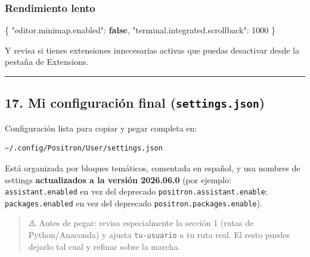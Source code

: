 \documentclass[
  doc,
  floatsintext,
  longtable,
  a4paper,
  nolmodern,
  notxfonts,
  notimes,
  12pt,
  colorlinks=true,linkcolor=blue,citecolor=blue,urlcolor=blue]{apa7}
\newenvironment{Shaded}{\begin{snugshade}}{\end{snugshade}}
\newcommand{\DataTypeTok}[1]{\textcolor[rgb]{0.68,0.00,0.00}{#1}}
\newcommand{\DecValTok}[1]{\textcolor[rgb]{0.68,0.00,0.00}{#1}}
\newcommand{\FunctionTok}[1]{\textcolor[rgb]{0.28,0.35,0.67}{#1}}
\newcommand{\KeywordTok}[1]{\textcolor[rgb]{0.00,0.23,0.31}{\textbf{#1}}}
\begin{document}
\subsubsection{Rendimiento lento}\label{rendimiento-lento}

\begin{Shaded}
\begin{Highlighting}[]
\FunctionTok{\{}
  \DataTypeTok{"editor.minimap.enabled"}\FunctionTok{:} \KeywordTok{false}\FunctionTok{,}
  \DataTypeTok{"terminal.integrated.scrollback"}\FunctionTok{:} \DecValTok{1000}
\FunctionTok{\}}
\end{Highlighting}
\end{Shaded}

Y revisa si tienes extensiones innecesarias activas que puedas
desactivar desde la pestaña de Extensions.

\begin{center}\rule{0.5\linewidth}{0.5pt}\end{center}

\subsection{\texorpdfstring{17. Mi configuración final
(\texttt{settings.json})}{17. Mi configuración final (settings.json)}}\label{mi-configuraciuxf3n-final-settings.json}

Configuración lista para copiar y pegar completa en:

\begin{verbatim}
~/.config/Positron/User/settings.json
\end{verbatim}

Está organizada por bloques temáticos, comentada en español, y usa
nombres de settings \textbf{actualizados a la versión 2026.06.0} (por
ejemplo: \texttt{assistant.enabled} en vez del deprecado
\texttt{positron.assistant.enable}; \texttt{packages.enabled} en vez del
deprecado \texttt{positron.packages.enable}).

\begin{quote}
⚠️ Antes de pegar: revisa especialmente la sección 1 (rutas de
Python/Anaconda) y ajusta \texttt{tu-usuario} a tu ruta real. El resto
puedes dejarlo tal cual y refinar sobre la marcha.
\end{quote}
\end{document}
